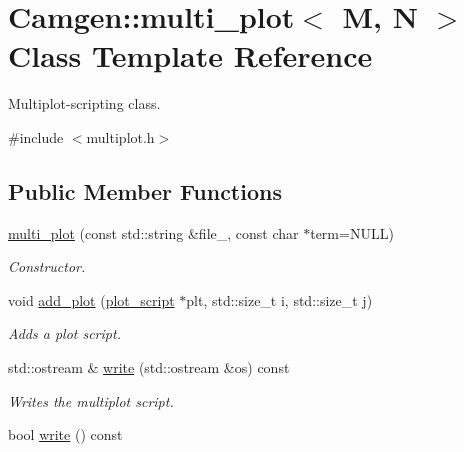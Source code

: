 \hypertarget{a00376}{\section{Camgen\-:\-:multi\-\_\-plot$<$ M, N $>$ Class Template Reference}
\label{a00376}
}


Multiplot-\/scripting class.  




{\ttfamily \#include $<$multiplot.\-h$>$}

\subsection*{Public Member Functions}
\begin{DoxyCompactItemize}
\item 
\hypertarget{a00376_aef053c10f5955934be8792fe0d5db63a}{\hyperlink{a00376_aef053c10f5955934be8792fe0d5db63a}{multi\-\_\-plot} (const std\-::string \&file\-\_\-, const char $\ast$term=N\-U\-L\-L)}\label{a00376_aef053c10f5955934be8792fe0d5db63a}

\begin{DoxyCompactList}\small\item\em Constructor. \end{DoxyCompactList}\item 
\hypertarget{a00376_a30977af8adb7db607839b4183c13e191}{void \hyperlink{a00376_a30977af8adb7db607839b4183c13e191}{add\-\_\-plot} (\hyperlink{a00426}{plot\-\_\-script} $\ast$plt, std\-::size\-\_\-t i, std\-::size\-\_\-t j)}\label{a00376_a30977af8adb7db607839b4183c13e191}

\begin{DoxyCompactList}\small\item\em Adds a plot script. \end{DoxyCompactList}\item 
\hypertarget{a00376_a1b2f538de3ee1a5334c34379999f905f}{std\-::ostream \& \hyperlink{a00376_a1b2f538de3ee1a5334c34379999f905f}{write} (std\-::ostream \&os) const }\label{a00376_a1b2f538de3ee1a5334c34379999f905f}

\begin{DoxyCompactList}\small\item\em Writes the multiplot script. \end{DoxyCompactList}\item 
\hypertarget{a00376_a12255f3c1213be24e44b711f5bd75a2e}{bool \hyperlink{a00376_a12255f3c1213be24e44b711f5bd75a2e}{write} () const }\label{a00376_a12255f3c1213be24e44b711f5bd75a2e}


\end{DoxyCompactItemize}
